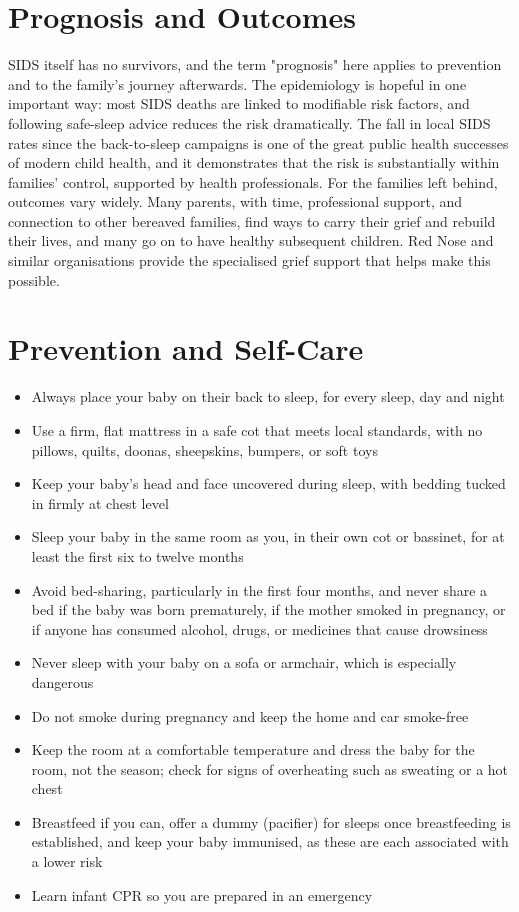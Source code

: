 \section*{Prognosis and Outcomes}
SIDS itself has no survivors, and the term "prognosis" here applies to prevention and to the family's journey afterwards. The epidemiology is hopeful in one important way: most SIDS deaths are linked to modifiable risk factors, and following safe-sleep advice reduces the risk dramatically. The fall in local SIDS rates since the back-to-sleep campaigns is one of the great public health successes of modern child health, and it demonstrates that the risk is substantially within families' control, supported by health professionals. For the families left behind, outcomes vary widely. Many parents, with time, professional support, and connection to other bereaved families, find ways to carry their grief and rebuild their lives, and many go on to have healthy subsequent children. Red Nose and similar organisations provide the specialised grief support that helps make this possible.

\section*{Prevention and Self-Care}
\begin{itemize}
    \item Always place your baby on their back to sleep, for every sleep, day and night
    \item Use a firm, flat mattress in a safe cot that meets local standards, with no pillows, quilts, doonas, sheepskins, bumpers, or soft toys
    \item Keep your baby's head and face uncovered during sleep, with bedding tucked in firmly at chest level
    \item Sleep your baby in the same room as you, in their own cot or bassinet, for at least the first six to twelve months
    \item Avoid bed-sharing, particularly in the first four months, and never share a bed if the baby was born prematurely, if the mother smoked in pregnancy, or if anyone has consumed alcohol, drugs, or medicines that cause drowsiness
    \item Never sleep with your baby on a sofa or armchair, which is especially dangerous
    \item Do not smoke during pregnancy and keep the home and car smoke-free
    \item Keep the room at a comfortable temperature and dress the baby for the room, not the season; check for signs of overheating such as sweating or a hot chest
    \item Breastfeed if you can, offer a dummy (pacifier) for sleeps once breastfeeding is established, and keep your baby immunised, as these are each associated with a lower risk
    \item Learn infant CPR so you are prepared in an emergency
\end{itemize}

